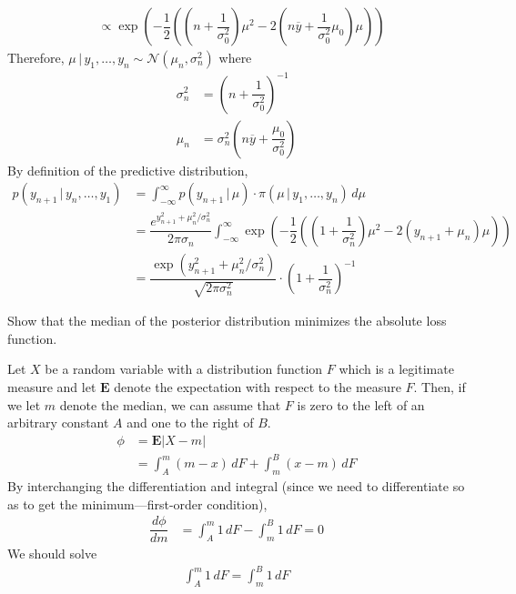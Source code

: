 \documentclass[answers]{exam}
\begin{document}
\begin{questions}
\begin{solution}
\begin{align}
      &\propto \exp\left(-\dfrac{1}{2}\left(\left(n+\dfrac{1}{\sigma_{0}^{2}}\right)\mu^{2}-2\left(n\overline{y}+\dfrac{1}{\sigma_{0}^{2}}\mu_{0}\right)\mu\right)\right)
    \end{align}
    Therefore, $\mu\,|\,y_{1},\ldots,y_{n}\sim\mathcal{N}\left(\mu_{n},\sigma_{n}^{2}\right)$ where
    \begin{align}
      \sigma_{n}^{2} &= \left(n+\dfrac{1}{\sigma_{0}^{2}}\right)^{-1}\\
      \mu_{n} &= \sigma_{n}^{2}\left(n\overline{y}+\dfrac{\mu_{0}}{\sigma_{0}^{2}}\right)
    \end{align}
    By definition of the predictive distribution,
    \begin{align}
      p\left(y_{n+1}\,|\,y_{n},\ldots,y_{1}\right) &= \int_{-\infty}^{\infty}p(y_{n+1}\,|\,\mu)\cdot \pi(\mu\,|\,y_{1},\ldots,y_{n})\,d\mu\\
      &= \dfrac{e^{y_{n+1}^{2}+\mu_{n}^{2}/\sigma_{n}^{2}}}{2\pi\sigma_{n}}\int_{-\infty}^{\infty}\exp\left(-\dfrac{1}{2}\left(\left(1+\dfrac{1}{\sigma_{n}^{2}}\right)\mu^{2}-2\left(y_{n+1}+\mu_{n}\right)\mu\right)\right)\\
      &= \dfrac{\exp\left(y_{n+1}^{2}+\mu_{n}^{2}/\sigma_{n}^{2}\right)}{\sqrt{2\pi\sigma_{n}^{2}}}\cdot\left(1+\dfrac{1}{\sigma_{n}^{2}}\right)^{-1}
    \end{align}
  \end{solution}
  \question
  Show that the median of the posterior distribution minimizes the absolute loss function.
  \begin{solution}
    Let $X$ be a random variable with a distribution function $F$ which is a legitimate measure and let $\mathbf{E}$ denote the expectation with respect to the measure $F$. Then, if we let $m$ denote the median, we can assume that $F$ is zero to the left of an arbitrary constant $A$ and one to the right of $B$.
    \begin{align}
      \phi &= \mathbf{E}\left|X-m\right|\\
      &= \int_{A}^{m}(m-x)\,dF+\int_{m}^{B}(x-m)\,dF
    \end{align}
    By interchanging the differentiation and integral (since we need to differentiate so as to get the minimum---first-order condition),
    \begin{align}
      \dfrac{d\phi}{dm} &= \int_{A}^{m}1\,dF -\int_{m}^{B}1\,dF =0
    \end{align}
    We should solve
    \begin{align}
      \int_{A}^{m}1\,dF = \int_{m}^{B}1\,dF

\end{align}
\end{solution}
\end{questions}
\end{document}
